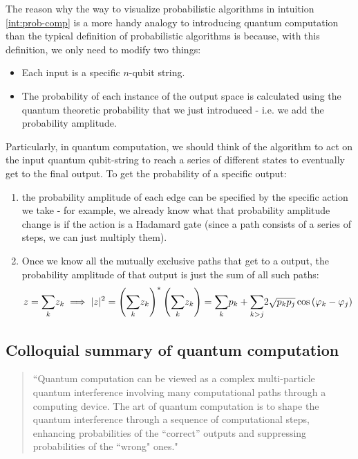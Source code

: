 \documentclass[12pt]{article}
\begin{document}
\begin{definition}
The reason why the way to visualize probabilistic algorithms in intuition \ref{int:prob-comp} is a more handy analogy to introducing quantum computation than the typical definition of probabilistic algorithms is because, with this definition, we only need to modify two things:
\begin{itemize}
    \item Each input is a specific $n$-qubit string.
    \item The probability of each instance of the output space is calculated using the quantum theoretic probability that we just introduced - i.e. we add the probability amplitude.
\end{itemize}

Particularly, in quantum computation, we should think of the algorithm to act on the input quantum qubit-string to reach a series of different states to eventually get to the final output. To get the probability of a specific output:
\begin{enumerate}
    \item the probability amplitude of each edge can be specified by the specific action we take - for example, we already know what that probability amplitude change is if the action is a Hadamard gate (since a path consists of a series of steps, we can just multiply them).
    \item Once we know all the mutually exclusive paths that get to a output, the probability amplitude of that output is just the sum of all such paths: $$
    z = \underset{k}{\sum}z_k\implies |z|^2 = \left(\underset{k}{\sum}z_k\right)^* \left(\underset{k}{\sum}z_k\right) = \underset{k}{\sum}p_k + \underset{k>j}{\sum}2\sqrt{p_kp_j}\cos\left(\varphi_k - \varphi_j\right)
    $$
\end{enumerate}
\end{definition}

\subsection{Colloquial summary of quantum computation}
\begin{quote}
``Quantum computation can be viewed as a complex multi-particle quantum interference involving many computational paths through a computing device. The art of quantum computation is to shape the quantum interference through a sequence of computational steps, enhancing probabilities of the “correct” outputs and suppressing probabilities of the ``wrong" ones."
\end{quote}
\end{document}
